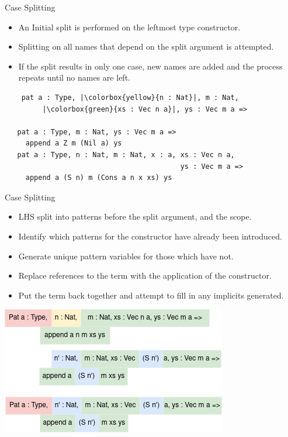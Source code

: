 \documentclass[presentation]{beamer}
\begin{document}
\begin{frame}[fragile]{Case Splitting} 
  \begin{itemize}
  \item An Initial split is performed on the leftmost type constructor.\\
  \item Splitting on all names that depend on the split argument is attempted. \\
  \item If the split results in only one case, new names are added and the process repeats until no names are left. \\ 
  \end{itemize}
  \begin{verbatim}
    pat a : Type, |\colorbox{yellow}{n : Nat}|, m : Nat,
         |\colorbox{green}{xs : Vec n a}|, ys : Vec m a =>

   pat a : Type, m : Nat, ys : Vec m a =>
     append a Z m (Nil a) ys 
   pat a : Type, n : Nat, m : Nat, x : a, xs : Vec n a,
                                          ys : Vec m a =>
     append a (S n) m (Cons a n x xs) ys   
  \end{verbatim}
\end{frame}

\begin{frame}[fragile]{Case Splitting}
\begin{itemize}
\item LHS split into patterns before the split argument, and the scope.
\item Identify which patterns for the constructor have already been introduced.
\item Generate unique pattern variables for those which have not.
\item Replace references to the term with the application of the constructor.
\item Put the term back together and attempt to fill in any implicits generated. 
\end{itemize}
\begin{center}
\includegraphics[scale=.5]{Resource/patSplit.png}
\end{center}
\end{frame}
\end{document}
